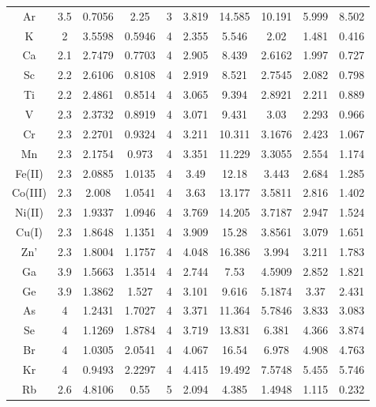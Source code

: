 \documentclass[journal]{IEEEtran}
\begin{document}
{\begin{longtable}{|c|c|c|c|c|c|c|c|c|c|}
		Ar       & 3.5 & 0.7056 & 2.25   & 3 & 3.819  & 14.585  & 10.191  & 5.999  & 8.502   \\
		K        & 2   & 3.5598 & 0.5946 & 4 & 2.355  & 5.546   & 2.02    & 1.481  & 0.416   \\
		Ca       & 2.1 & 2.7479 & 0.7703 & 4 & 2.905  & 8.439   & 2.6162  & 1.997  & 0.727   \\
		Sc       & 2.2 & 2.6106 & 0.8108 & 4 & 2.919  & 8.521   & 2.7545  & 2.082  & 0.798   \\
		Ti       & 2.2 & 2.4861 & 0.8514 & 4 & 3.065  & 9.394   & 2.8921  & 2.211  & 0.889   \\
		V        & 2.3 & 2.3732 & 0.8919 & 4 & 3.071  & 9.431   & 3.03    & 2.293  & 0.966   \\
		Cr       & 2.3 & 2.2701 & 0.9324 & 4 & 3.211  & 10.311  & 3.1676  & 2.423  & 1.067   \\
		Mn       & 2.3 & 2.1754 & 0.973  & 4 & 3.351  & 11.229  & 3.3055  & 2.554  & 1.174   \\
		Fe(II)   & 2.3 & 2.0885 & 1.0135 & 4 & 3.49   & 12.18   & 3.443   & 2.684  & 1.285   \\
		Co(III)  & 2.3 & 2.008  & 1.0541 & 4 & 3.63   & 13.177  & 3.5811  & 2.816  & 1.402   \\
		Ni(II)   & 2.3 & 1.9337 & 1.0946 & 4 & 3.769  & 14.205  & 3.7187  & 2.947  & 1.524   \\
		Cu(I)    & 2.3 & 1.8648 & 1.1351 & 4 & 3.909  & 15.28   & 3.8561  & 3.079  & 1.651   \\
		Zn'      & 2.3 & 1.8004 & 1.1757 & 4 & 4.048  & 16.386  & 3.994   & 3.211  & 1.783   \\
		Ga       & 3.9 & 1.5663 & 1.3514 & 4 & 2.744  & 7.53    & 4.5909  & 2.852  & 1.821   \\
		Ge       & 3.9 & 1.3862 & 1.527  & 4 & 3.101  & 9.616   & 5.1874  & 3.37   & 2.431   \\
		As       & 4   & 1.2431 & 1.7027 & 4 & 3.371  & 11.364  & 5.7846  & 3.833  & 3.083   \\
		Se       & 4   & 1.1269 & 1.8784 & 4 & 3.719  & 13.831  & 6.381   & 4.366  & 3.874   \\
		Br       & 4   & 1.0305 & 2.0541 & 4 & 4.067  & 16.54   & 6.978   & 4.908  & 4.763   \\
		Kr       & 4   & 0.9493 & 2.2297 & 4 & 4.415  & 19.492  & 7.5748  & 5.455  & 5.746   \\
		Rb       & 2.6 & 4.8106 & 0.55   & 5 & 2.094  & 4.385   & 1.4948  & 1.115  & 0.232   \\

\end{longtable}}
\end{document}
